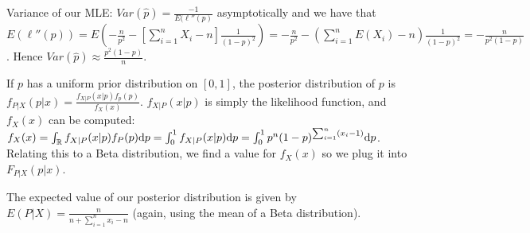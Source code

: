 \documentclass[letterpaper, 8pt]{extarticle}
\begin{document}
\begin{multicols*}{3}
\begin{enumerate}[label=\alph*), wide, labelwidth=0pt, labelindent=0pt]
		Variance of our MLE: $Var(\hat p)=\frac{-1}{E(\ell''(p)}$ asymptotically and we have that $E(\ell''(p))=E\left(-\frac{n}{p^2}-\left[\sum_{i=1}^nX_i-n\right]\frac{1}{(1-p)^2}\right)=-\frac{n}{p^2}-\left(\sum_{i=1}^nE(X_i)-n\right)\frac{1}{(1-p)^2}=-\frac{n}{p^2(1-p)}$. Hence $Var(\hat p)\approx\frac{p^2(1-p)}{n}$.
		
		If $p$ has a uniform prior distribution on $[0,1]$, the posterior distribution of $p$ is $f_{P|X}(p|x)=\frac{f_{X|P}(x|p)f_p(p)}{f_X(x)}$. $f_{X|P}(x|p)$ is simply the likelihood function, and $f_X(x)$ can be computed: $f_X(x)=\int_\mathbb R f_{X|P}(x|p)f_P(p)\dd p=\int_0^1f_{X|P}(x|p)\dd p=\int_0^1p^n(1-p)^{\sum_{i=1}^n(x_i-1)}\dd p$. Relating this to a Beta distribution, we find a value for $f_X(x)$ so we plug it into $F_{P|X}(p|x)$.
		
		The expected value of our posterior distribution is given by $E(P|X)=\frac{n}{n+\sum_{i=1}^nx_i-n}$ (again, using the mean of a Beta distribution).
	\end{enumerate}
\end{multicols*}
\end{document}
